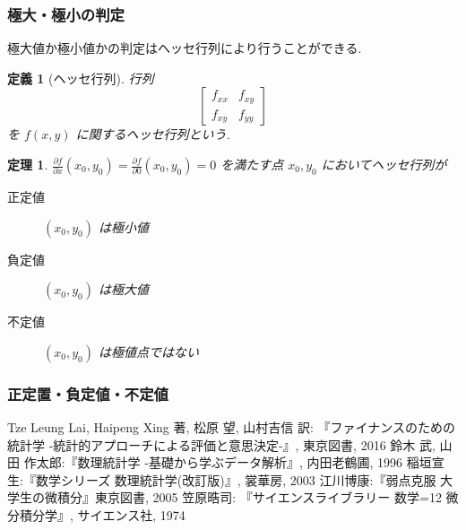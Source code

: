\documentclass{jsarticle}
\theoremstyle{plain}
\newtheorem{theo}{定理}[section]
\newtheorem{defi}{定義}[section]
\begin{document}

  \subsubsection{極大・極小の判定}
  極大値か極小値かの判定はヘッセ行列により行うことができる.

  \begin{defi}[ヘッセ行列]
    行列
    \begin{equation*}
      \left[
        \begin{array}{cc}
          f_{xx} & f_{xy} \\
          f_{xy} & f_{yy}
        \end{array}
      \right]
    \end{equation*}
    を $f(x, y)$ に関するヘッセ行列という.
  \end{defi}

  \begin{theo}
    $\frac{\partial f}{\partial x}(x_0, y_0) = \frac{\partial f}{\partial 0}(x_0, y_0) = 0$ を満たす点 $x_0, y_0$ においてヘッセ行列が\footnotemark
    \begin{description}
      \item[正定値] $(x_0, y_0)$ は極小値
      \item[負定値] $(x_0, y_0)$ は極大値
      \item[不定値] $(x_0, y_0)$ は極値点ではない
    \end{description}
  \end{theo}

  \subsubsection{正定置・負定値・不定値}


  \begin{thebibliography}{9}
     Tze Leung Lai, Haipeng Xing 著, 松原 望, 山村吉信 訳: 『ファイナンスのための統計学 -統計的アプローチによる評価と意思決定-』, 東京図書, 2016
     鈴木 武, 山田 作太郎:『数理統計学 -基礎から学ぶデータ解析』, 内田老鶴圃, 1996
     稲垣宣生:『数学シリーズ 数理統計学(改訂版)』, 裳華房, 2003
     江川博康:『弱点克服 大学生の微積分』東京図書, 2005
     笠原晧司: 『サイエンスライブラリー 数学=12 微分積分学』, サイエンス社, 1974
  \end{thebibliography}
\end{document}
